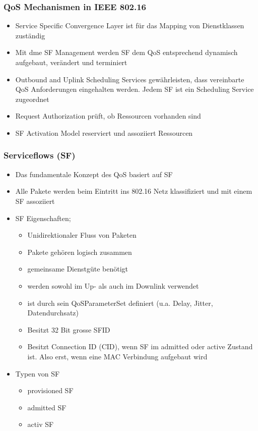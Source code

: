 \subsubsection{QoS Mechanismen in IEEE 802.16}
\begin{itemize}
\item Service Specific Convergence Layer ist für das Mapping von Dienstklassen zuständig
\item Mit dme SF Management werden SF dem QoS entsprechend dynamisch aufgebaut, verändert und terminiert
\item Outbound and Uplink Scheduling Services gewährleisten, dass vereinbarte QoS Anforderungen eingehalten werden. Jedem SF ist ein Scheduling Service zugeordnet
\item Request Authorization prüft, ob Ressourcen vorhanden sind
\item SF Activation Model reserviert und assoziiert Ressourcen
\end{itemize}

\subsubsection{Serviceflows (SF)}
\begin{itemize}
\item Das fundamentale Konzept des QoS basiert auf SF
\item Alle Pakete werden beim Eintritt ins 802.16 Netz klassifiziert und mit einem SF assoziiert
\item SF Eigenschaften;
\begin{itemize}
\item Unidirektionaler Fluss von Paketen
\item Pakete gehören logisch zusammen
\item gemeinsame Dienstgüte benötigt
\item werden sowohl im Up- als auch im Downlink verwendet
\item ist durch sein QoSParameterSet definiert (u.a. Delay, Jitter, Datendurchsatz)
\item Besitzt 32 Bit grosse SFID
\item Besitzt Connection ID (CID), wenn SF im admitted oder active Zustand ist. Also erst, wenn eine MAC Verbindung aufgebaut wird
\end{itemize}
\item Typen von SF 
\begin{itemize}
\item provisioned SF
\item admitted SF
\item activ SF
\end{itemize}
\end{itemize}

